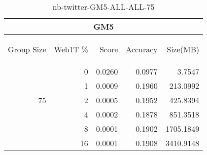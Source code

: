 \begin{center}
\begin{table}[htbp] 
 \begin{center}
\begin{tabular}{ | r | r | r | r | r |}
\hline
\multicolumn{5}{|c|}{GM5}\\
\hline
\begin{sideways}Group Size\end{sideways} & \begin{sideways}Web1T \%\end{sideways} & \begin{sideways}Score\end{sideways} & \begin{sideways}Accuracy\end{sideways} & \begin{sideways}Size(MB)\end{sideways}\\
\hline
\multirow{5}{*}{75}
 & 0 & 0.0260 & 0.0977 & 3.7547\\ \cline{2-5}
 & 1 & 0.0009 & 0.1960 & 213.0992\\ \cline{2-5}
 & 2 & 0.0005 & 0.1952 & 425.8394\\ \cline{2-5}
 & 4 & 0.0002 & 0.1878 & 851.3518\\ \cline{2-5}
 & 8 & 0.0001 & 0.1902 & 1705.1849\\ \cline{2-5}
 & 16 & 0.0001 & 0.1908 & 3410.9148\\ \cline{2-5}
\hline
\end{tabular}
\caption{nb-twitter-GM5-ALL-ALL-75}
\label{table:nb-twitter-GM5-ALL-ALL-75}
\end{center}
 \end{table}
\end{center}

